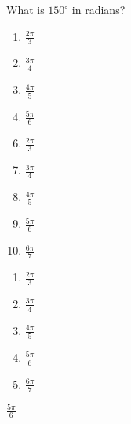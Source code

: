 
  What is $150^\circ$ in radians?


\ifsat
	\begin{enumerate}[label=\Alph*)]
		\item    $\frac{2\pi}{3}$
		\item  $\frac{3\pi}{4}$
		\item $\frac{4\pi}{5}$
		\item $\frac{5\pi}{6}$ %
	\end{enumerate}
\else
\fi

\ifacteven
	\begin{enumerate}[label=\textbf{\Alph*.},itemsep=\fill,align=left]
		\setcounter{enumii}{5}
		\item    $\frac{2\pi}{3}$
		\item  $\frac{3\pi}{4}$
		\item $\frac{4\pi}{5}$
		\addtocounter{enumii}{1}
		\item $\frac{5\pi}{6}$ %
		\item  $\frac{6\pi}{7}$
	\end{enumerate}
\else
\fi

\ifactodd
	\begin{enumerate}[label=\textbf{\Alph*.},itemsep=\fill,align=left]
		\item    $\frac{2\pi}{3}$
		\item  $\frac{3\pi}{4}$
		\item $\frac{4\pi}{5}$
		\item $\frac{5\pi}{6}$ %
		\item  $\frac{6\pi}{7}$
	\end{enumerate}
\else
\fi

\ifgridin
 $\frac{5\pi}{6}$ %

\else
\fi

